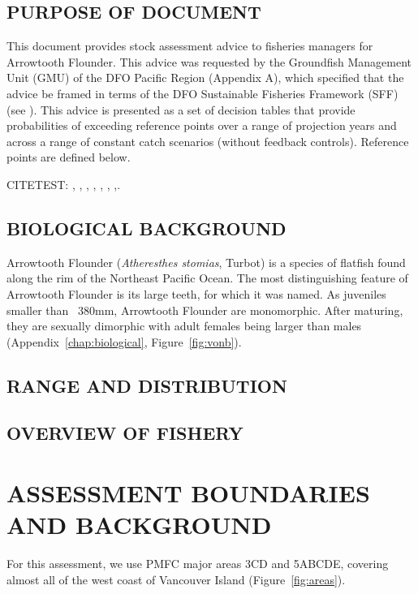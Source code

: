 \documentclass[11pt]{book}\usepackage[]{graphicx}\usepackage[]{color}
\begin{document}
\subsection{PURPOSE OF DOCUMENT}

This document provides stock assessment advice to fisheries managers for Arrowtooth Flounder. This advice was requested by the Groundfish Management Unit (GMU) of the DFO Pacific Region (Appendix A), which specified that the advice be framed in terms of the DFO Sustainable Fisheries Framework (SFF) (see \citet{dfo09}). This advice is presented as a set of decision tables that provide probabilities of exceeding reference points over a range of projection years and across a range of constant catch scenarios (without feedback controls). Reference points are defined below.

CITETEST: \citet{arf1995}, \citet{arf1999a}, \citet{arf1999b}, \citet{arf2000}, \citet{arf2001}, \citet{arf2003}, \citet{arf2006},\citet{arf2013}.

\subsection{BIOLOGICAL BACKGROUND}

Arrowtooth Flounder (\emph{Atheresthes stomias}, Turbot) is a species of flatfish found along the rim of the Northeast Pacific Ocean. The most distinguishing feature of Arrowtooth Flounder is its large teeth, for which it was named. As juveniles smaller than ~380mm, Arrowtooth Flounder are monomorphic. After maturing, they are sexually dimorphic with adult females being larger than males (Appendix~\ref{chap:biological}, Figure~\ref{fig:vonb}).

\subsection{RANGE AND DISTRIBUTION}


\subsection{OVERVIEW OF FISHERY}


\section{ASSESSMENT BOUNDARIES AND BACKGROUND}

For this assessment, we use PMFC major areas 3CD and 5ABCDE, covering almost all of the west coast of Vancouver Island (Figure~\ref{fig:areas}).
\end{document}

